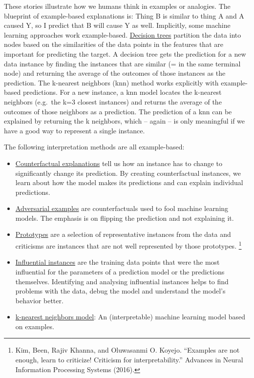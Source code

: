 \documentclass[
  12pt,
]{krantz}
\providecommand{\tightlist}{%
  \setlength{\itemsep}{0pt}\setlength{\parskip}{0pt}}
\begin{document}
These stories illustrate how we humans think in examples or analogies.
The blueprint of example-based explanations is:
Thing B is similar to thing A and A caused Y, so I predict that B will cause Y as well.
Implicitly, some machine learning approaches work example-based.
\protect\hyperlink{tree}{Decision trees} partition the data into nodes based on the similarities of the data points in the features that are important for predicting the target.
A decision tree gets the prediction for a new data instance by finding the instances that are similar (= in the same terminal node) and returning the average of the outcomes of those instances as the prediction.
The k-nearest neighbors (knn) method works explicitly with example-based predictions.
For a new instance, a knn model locates the k-nearest neighbors (e.g.~the k=3 closest instances) and returns the average of the outcomes of those neighbors as a prediction.
The prediction of a knn can be explained by returning the k neighbors, which -- again -- is only meaningful if we have a good way to represent a single instance.

The following interpretation methods are all example-based:

\begin{itemize}
\tightlist
\item
  \protect\hyperlink{counterfactual}{Counterfactual explanations} tell us how an instance has to change to significantly change its prediction.
  By creating counterfactual instances, we learn about how the model makes its predictions and can explain individual predictions.
\item
  \protect\hyperlink{adversarial}{Adversarial examples} are counterfactuals used to fool machine learning models.
  The emphasis is on flipping the prediction and not explaining it.
\item
  \protect\hyperlink{proto}{Prototypes} are a selection of representative instances from the data and criticisms are instances that are not well represented by those prototypes. \footnote{Kim, Been, Rajiv Khanna, and Oluwasanmi O. Koyejo. ``Examples are not enough, learn to criticize! Criticism for interpretability.'' Advances in Neural Information Processing Systems (2016).}
\item
  \protect\hyperlink{influential}{Influential instances} are the training data points that were the most influential for the parameters of a prediction model or the predictions themselves.
  Identifying and analysing influential instances helps to find problems with the data, debug the model and understand the model's behavior better.
\item
  \protect\hyperlink{other-interpretable}{k-nearest neighbors model}: An (interpretable) machine learning model based on examples.
\end{itemize}
\end{document}
